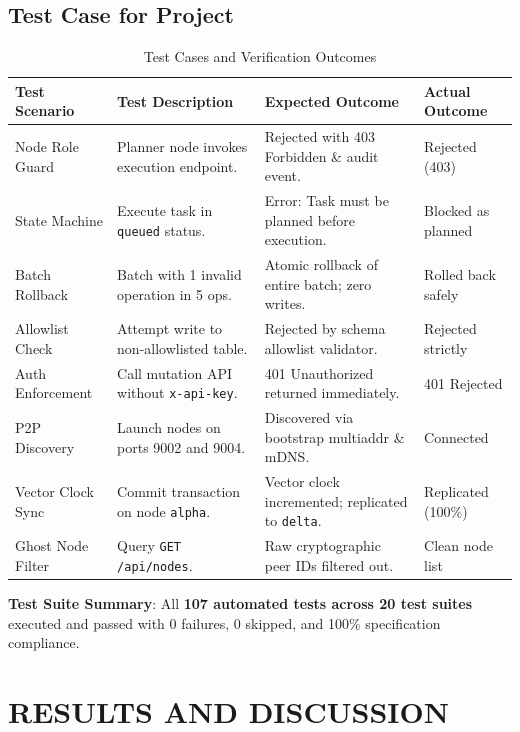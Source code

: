 \documentclass[12pt,a4paper]{report}
\begin{document}
\section{Test Case for Project}
\begin{table}[H]
\centering
\caption{Test Cases and Verification Outcomes}
\label{tab:test_cases}
\begin{tabularx}{\textwidth}{|l|X|X|l|}
\hline
\textbf{Test Scenario} & \textbf{Test Description} & \textbf{Expected Outcome} & \textbf{Actual Outcome} \\
\hline
Node Role Guard & Planner node invokes execution endpoint. & Rejected with 403 Forbidden \& audit event. & Rejected (403) \\
State Machine & Execute task in \texttt{queued} status. & Error: Task must be planned before execution. & Blocked as planned \\
Batch Rollback & Batch with 1 invalid operation in 5 ops. & Atomic rollback of entire batch; zero writes. & Rolled back safely \\
Allowlist Check & Attempt write to non-allowlisted table. & Rejected by schema allowlist validator. & Rejected strictly \\
Auth Enforcement & Call mutation API without \texttt{x-api-key}. & 401 Unauthorized returned immediately. & 401 Rejected \\
P2P Discovery & Launch nodes on ports 9002 and 9004. & Discovered via bootstrap multiaddr \& mDNS. & Connected \\
Vector Clock Sync & Commit transaction on node \texttt{alpha}. & Vector clock incremented; replicated to \texttt{delta}. & Replicated (100\%) \\
Ghost Node Filter & Query \texttt{GET /api/nodes}. & Raw cryptographic peer IDs filtered out. & Clean node list \\
\hline
\end{tabularx}
\end{table}

\noindent
\textbf{Test Suite Summary}: All \textbf{107 automated tests across 20 test suites} executed and passed with 0 failures, 0 skipped, and 100\% specification compliance.

\chapter{RESULTS AND DISCUSSION}
\end{document}
